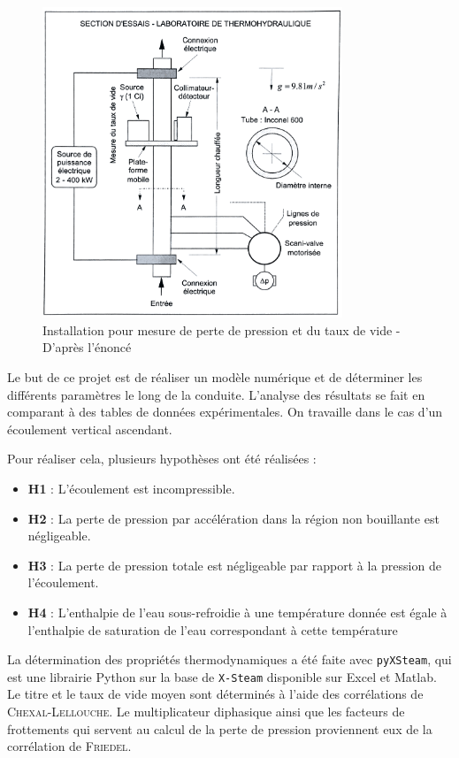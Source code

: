 \begin{figure}[htbp]
    \centering
    \includegraphics[width=0.8\textwidth]{images/schema_instal.png}
    \caption{Installation pour mesure de perte de pression et du taux de vide - D'après l'énoncé}
    \label{fig:instal}
\end{figure}

Le but de ce projet est de réaliser un modèle numérique et de déterminer les différents paramètres le long de la conduite. L'analyse des résultats se fait en comparant à des tables de données expérimentales. On travaille dans le cas d'un écoulement vertical ascendant.\\ \par
Pour réaliser cela, plusieurs hypothèses ont été réalisées :
\begin{itemize}
    \item \textbf{H1} : L'écoulement est incompressible.
    \item \textbf{H2} : La perte de pression par accélération dans la région non bouillante est négligeable.
    \item \textbf{H3} : La perte de pression totale est négligeable par rapport à la pression de l'écoulement.
    \item \textbf{H4} : L'enthalpie de l'eau sous-refroidie à une température donnée est égale à l'enthalpie de saturation de l'eau correspondant à cette température
\end{itemize}
\vspace{12pt}
\par
La détermination des propriétés thermodynamiques a été faite avec \texttt{pyXSteam}, qui est une librairie Python sur la base de \texttt{X-Steam} disponible sur Excel et Matlab.\\
Le titre et le taux de vide moyen sont déterminés à l'aide des corrélations de \textsc{Chexal-Lellouche}. Le multiplicateur diphasique ainsi que les facteurs de frottements qui servent au calcul de la perte de pression proviennent eux de la corrélation de \textsc{Friedel}.\\ \par






